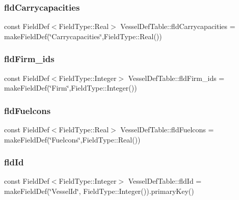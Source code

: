 \subsubsection{\texorpdfstring{fldCarrycapacities}{fldCarrycapacities}}
{\footnotesize\ttfamily const Field\+Def$<$Field\+Type\+::\+Real$>$ Vessel\+Def\+Table\+::fld\+Carrycapacities = make\+Field\+Def(\char`\"{}Carrycapacities\char`\"{},Field\+Type\+::\+Real())}

\mbox{\label{class_vessel_def_table_a789bc419a1e80d8e6b7b0d96c2215d90}} 
\subsubsection{\texorpdfstring{fldFirm\_ids}{fldFirm\_ids}}
{\footnotesize\ttfamily const Field\+Def$<$Field\+Type\+::\+Integer$>$ Vessel\+Def\+Table\+::fld\+Firm\+\_\+ids = make\+Field\+Def(\char`\"{}Firm\char`\"{},Field\+Type\+::\+Integer())}

\mbox{\label{class_vessel_def_table_aa6dcc37cdc8bfd22f59e2e171705daa5}} 
\subsubsection{\texorpdfstring{fldFuelcons}{fldFuelcons}}
{\footnotesize\ttfamily const Field\+Def$<$Field\+Type\+::\+Real$>$ Vessel\+Def\+Table\+::fld\+Fuelcons = make\+Field\+Def(\char`\"{}Fuelcons\char`\"{},Field\+Type\+::\+Real())}

\mbox{\label{class_vessel_def_table_a4563302a8e9e40017c14b0298920fcf3}} 
\subsubsection{\texorpdfstring{fldId}{fldId}}
{\footnotesize\ttfamily const Field\+Def$<$Field\+Type\+::\+Integer$>$ Vessel\+Def\+Table\+::fld\+Id = make\+Field\+Def(\char`\"{}Vessel\+Id\char`\"{}, Field\+Type\+::\+Integer()).primary\+Key()}

\mbox{\label{class_vessel_def_table_af5536458974e15523e5c01fef0fb6d94}} 
